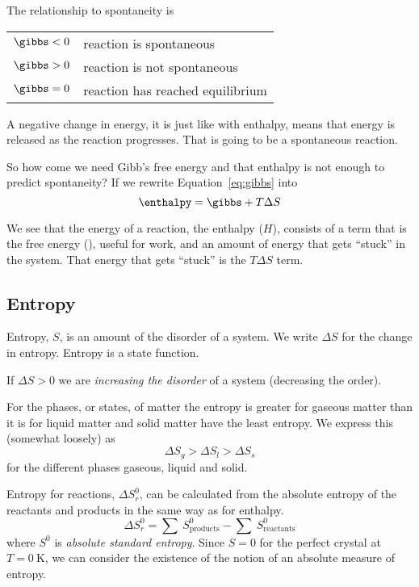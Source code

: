 \documentclass[../mit-general-chemistry.tex]{subfiles}
\begin{document}
The relationship to spontaneity is

\begin{center}
  \begin{tabular}{ll}
    $\gibbs < 0$ & reaction is spontaneous \\
    $\gibbs > 0$ & reaction is not spontaneous \\
    $\gibbs = 0$ & reaction has reached equilibrium  \\
  \end{tabular}
\end{center}


A negative change in energy, it is just like with enthalpy, means that
energy is released as the reaction progresses. That is going to be a
spontaneous reaction.


So how come we need Gibb's free energy and that enthalpy is not enough
to predict spontaneity? If we rewrite Equation~\ref{eq:gibbs} into
\begin{equation*}
  \enthalpy = \gibbs + T \Delta S
\end{equation*}

We see that the energy of a reaction, the enthalpy ($H$), consists of
a term that is the free energy (\gibbs), useful for work, and an
amount of energy that gets ``stuck'' in the system. That energy that
gets ``stuck'' is the $T \Delta S$ term.




\subsection{Entropy}


Entropy, $S$, is an amount of the disorder of a system. We write
$\Delta S$ for the change in entropy. Entropy is a state function.

If $\Delta S > 0$ we are {\em increasing the disorder} of a system
(decreasing the order).

For the phases, or states, of matter the entropy is greater for
gaseous matter than it is for liquid matter and solid matter have the
least entropy. We express this (somewhat loosely) as
\begin{equation*}
  \Delta S_g > \Delta S_l > \Delta S_s
\end{equation*}
for the different phases gaseous, liquid and solid.


Entropy for reactions, $\Delta S_r^0$, can be calculated from the
absolute entropy of the reactants and products in the same way as for
enthalpy.
\begin{equation*}
  \Delta S_r^0 = \sum~S^0_{\text{products}} - \sum~S^0_{\text{reactants}}
\end{equation*}
where $S^0$ is {\em absolute standard entropy}. Since $S = 0$ for the
perfect crystal at $T = \SI{0}{\kelvin}$, we can consider the
existence of the notion of an absolute measure of entropy.
\end{document}
